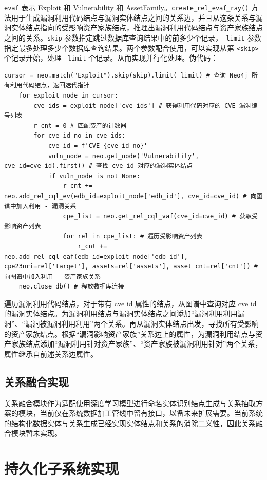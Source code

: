 \documentclass[a4paper,AutoFakeBold,oneside,12pt]{book}
\begin{document}
\lstinline|evaf| 表示 Exploit 和 Vulnerability 和 AssetFamily。\lstinline|create_rel_evaf_ray()| 方法用于生成漏洞利用代码结点与漏洞实体结点之间的关系边，并且从这条关系与漏洞实体结点指向的受影响资产家族结点，推理出漏洞利用代码结点与资产家族结点之间的关系。\lstinline|skip| 参数指定跳过数据库查询结果中的前多少个记录，\lstinline|_limit| 参数指定最多处理多少个数据库查询结果。两个参数配合使用，可以实现从第 \lstinline|<skip>| 个记录开始，处理 \lstinline|_limit| 个记录。从而实现并行化处理。伪代码：
\begin{lstlisting}[style=lgeneral]
	cursor = neo.match("Exploit").skip(skip).limit(_limit) # 查询 Neo4j 所有利用代码结点，返回迭代指针
	for exploit_node in cursor:
		cve_ids = exploit_node['cve_ids'] # 获得利用代码对应的 CVE 漏洞编号列表
		r_cnt = 0 # 匹配资产的计数器
		for cve_id_no in cve_ids:
			cve_id = f'CVE-{cve_id_no}'
			vuln_node = neo.get_node('Vulnerability', cve_id=cve_id).first() # 查找 cve_id 对应的漏洞实体结点
			if vuln_node is not None:
				r_cnt += neo.add_rel_cql_ev(edb_id=exploit_node['edb_id'], cve_id=cve_id) # 向图谱中加入利用 - 漏洞关系
				cpe_list = neo.get_rel_cql_vaf(cve_id=cve_id) # 获取受影响资产列表
				for rel in cpe_list: # 遍历受影响资产列表
					r_cnt += neo.add_rel_cql_eaf(edb_id=exploit_node['edb_id'], cpe23uri=rel['target'], assets=rel['assets'], asset_cnt=rel['cnt']) # 向图谱中加入利用 - 资产家族关系
	neo.close_db() # 释放数据库连接
\end{lstlisting}

遍历漏洞利用代码结点，对于带有 cve id 属性的结点，从图谱中查询对应 cve id 的漏洞实体结点。为漏洞利用结点与漏洞实体结点之间添加``漏洞利用利用漏洞''、``漏洞被漏洞利用利用''两个关系。再从漏洞实体结点出发，寻找所有受影响的资产家族结点。根据``漏洞影响资产家族''关系边上的属性，为漏洞利用结点与资产家族结点添加``漏洞利用针对资产家族''、``资产家族被漏洞利用针对''两个关系，属性继承自前述关系边属性。

\subsection{关系融合实现}

关系融合模块作为适配使用深度学习模型进行命名实体识别结点生成与关系抽取方案的模块，当前仅在系统数据加工管线中留有接口，以备未来扩展需要。当前系统的结构化数据实体与关系生成已经实现实体结点和关系的消除二义性，因此关系融合模块暂未实现。

\section{持久化子系统实现}
\end{document}
